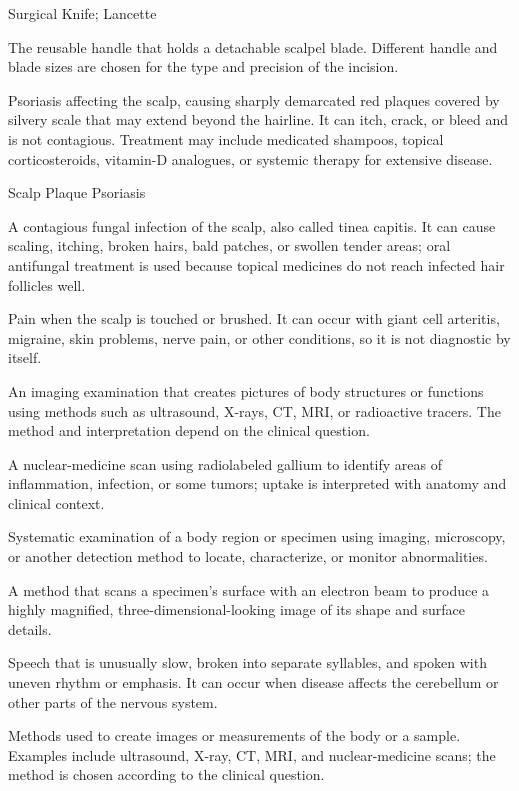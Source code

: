 \synonyms
Surgical Knife; Lancette

 The reusable handle that holds a detachable scalpel blade. Different handle and blade sizes are chosen for the type and precision of the incision.

 Psoriasis affecting the scalp, causing sharply demarcated red plaques covered by silvery scale that may extend beyond
the hairline. It can itch, crack, or bleed and is not contagious. Treatment may include medicated shampoos, topical
corticosteroids, vitamin-D analogues, or systemic therapy for extensive disease.

\synonyms
Scalp Plaque Psoriasis

 A contagious fungal infection of the scalp, also called tinea capitis. It can cause scaling, itching, broken hairs, bald patches, or swollen tender areas; oral antifungal treatment is used because topical medicines do not reach infected hair follicles well.

 Pain when the scalp is touched or brushed. It can occur with giant cell arteritis, migraine, skin problems, nerve pain, or other conditions, so it is not diagnostic by itself.

 An imaging examination that creates pictures of body structures or functions using methods such as ultrasound, X-rays, CT, MRI, or radioactive tracers. The method and interpretation depend on the clinical question.

 A nuclear-medicine scan using radiolabeled gallium to identify areas of inflammation, infection, or some tumors; uptake is interpreted with anatomy and clinical context.

 Systematic examination of a body region or specimen using imaging, microscopy, or another detection method to locate, characterize, or monitor abnormalities.

 A method that scans a specimen’s surface with an electron beam to produce a highly magnified, three-dimensional-looking image of its shape and surface details.

 Speech that is unusually slow, broken into separate syllables, and spoken with uneven rhythm or emphasis. It can occur when disease affects the cerebellum or other parts of the nervous system.

 Methods used to create images or measurements of the body or a sample. Examples include ultrasound, X-ray, CT, MRI, and nuclear-medicine scans; the method is chosen according to the clinical question.

